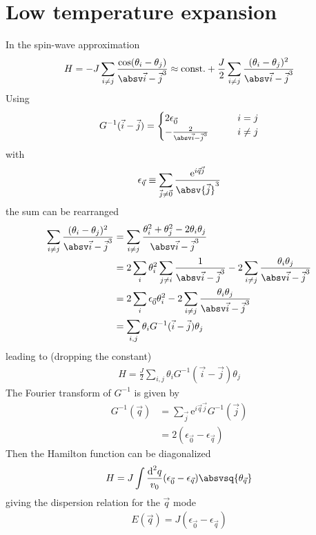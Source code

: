 \section{Low temperature expansion}
In the spin-wave approximation
\begin{align*}
H=-J \sum_{i\ne j} \frac{\cos(\theta_i - \theta_j)}{\aij} \approx \text{const.} + \frac{J}{2} \sum_{i\ne j} \frac{(\theta_i - \theta_j)^2}{\aij}
\end{align*}
Using
\begin{align*}
G^{-1}(\vec{i}-\vec{j}) = \begin{cases}2\epsilon_{\vec{0}} \qquad  &i=j\\-\frac{2}{\aij}\qquad &i\ne j\end{cases}
\end{align*}
with
\begin{align*}
\epsilon_{\vec{q}} \equiv \sum_{\vec{j}\ne \vec{0}} \frac{\text{e}^{i \vec{q} \vec{j}}}{\absv{\vec{j}}^3}
\end{align*}
the sum can be rearranged
\begin{align*}
\sum_{i\ne j} \frac{(\theta_i - \theta_j)^2}{\aij} &= \sum_{i\ne j} \frac{\theta_i^2 + \theta_j^2- 2 \theta_i \theta_j}{\aij} \\
&=
2 \sum_i \theta_i^2 \sum_{j\ne i} \frac{1}{\aij} - 2 \sum_{i\ne j} \frac{\theta_i \theta_j}{\aij} \\
&=
2 \sum_i \epsilon_{\vec{0}} \theta_i^2 - 2 \sum_{i\ne j} \frac{\theta_i \theta_j}{\aij} \\
&= \sum_{i, j} \theta_i G^{-1}(\vec{i}-\vec{j}) \theta_j
\end{align*}
leading to (dropping the constant)
\begin{align*}
H=\frac{J}{2} \sum_{i, j} \theta_i G^{-1}(\vec{i}-\vec{j}) \theta_j
\end{align*}
The Fourier transform of $G^{-1}$ is given by
\begin{align*}
G^{-1}(\vec{q})&=\sum_{\vec{j}} \text{e}^{i \vec{q} \vec{j}} G^{-1}(\vec{j}) \\
&=2(\epsilon_{\vec{0}} - \epsilon_{\vec{q}})
\end{align*}
Then the Hamilton function can be diagonalized
\begin{align*}
H=J \int \frac{\text{d}^2q}{v_0} (\epsilon_{\vec{0}} - \epsilon_{\vec{q}}) \absvsq{\theta_{\vec{q}}}
\end{align*}
giving the dispersion relation for the $\vec{q}$ mode
\begin{align*}
E(\vec{q}) = J (\epsilon_{\vec{0}} - \epsilon_{\vec{q}})
\end{align*}
